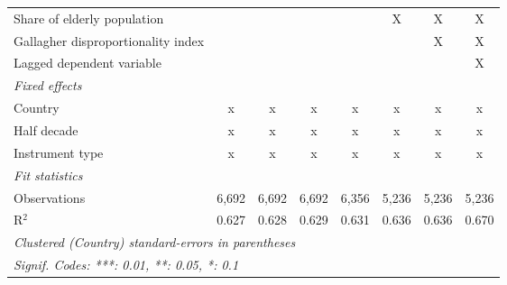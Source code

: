 \begin{tabular}{lccccccc}
   Share of elderly population                                                              &              &               &               &              & X       & X       & X\\  
   Gallagher disproportionality index                                                       &              &               &               &              &         & X       & X\\  
   Lagged dependent variable                                                                &              &               &               &              &         &         & X\\  
   \emph{Fixed effects}\\
   Country                                                                                  & x            & x             & x             & x            & x       & x       & x\\  
   Half decade                                                                              & x            & x             & x             & x            & x       & x       & x\\  
   Instrument type                                                                          & x            & x             & x             & x            & x       & x       & x\\  
   \midrule \emph{Fit statistics}\\
   Observations                                                                             & 6,692        & 6,692         & 6,692         & 6,356        & 5,236   & 5,236   & 5,236\\  
   R$^2$                                                                                    & 0.627        & 0.628         & 0.629         & 0.631        & 0.636   & 0.636   & 0.670\\  
   \midrule
   \multicolumn{8}{l}{\emph{Clustered (Country) standard-errors in parentheses}}\\
   \multicolumn{8}{l}{\emph{Signif. Codes: ***: 0.01, **: 0.05, *: 0.1}}\\
\end{tabular}
\par\endgroup


